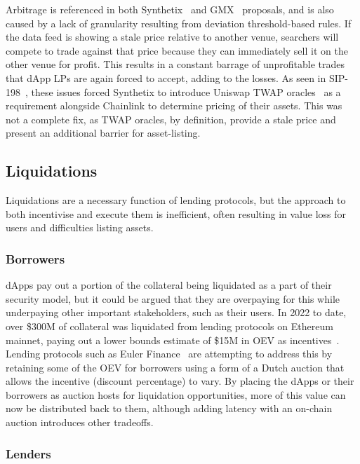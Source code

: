 \documentclass[11pt]{article}
\begin{document}
Arbitrage is referenced in both Synthetix~\cite{sip-198} and GMX~\cite{kip-17} proposals, and is also caused by a lack of granularity resulting from deviation threshold-based rules.
If the data feed is showing a stale price relative to another venue, searchers will compete to trade against that price because they can immediately sell it on the other venue for profit.
This results in a constant barrage of unprofitable trades that dApp LPs are again forced to accept, adding to the losses.
As seen in SIP-198~\cite{sip-198}, these issues forced Synthetix to introduce Uniswap TWAP oracles~\cite{uniswap} as a requirement alongside Chainlink to determine pricing of their assets.
This was not a complete fix, as TWAP oracles, by definition, provide a stale price and present an additional barrier for asset-listing.

\subsection{Liquidations}

Liquidations are a necessary function of lending protocols, but the approach to both incentivise and execute them is inefficient, often resulting in value loss for users and difficulties listing assets.

\subsubsection{Borrowers}

dApps pay out a portion of the collateral being liquidated as a part of their security model, but it could be argued that they are overpaying for this while underpaying other important stakeholders, such as their users.
In 2022 to date, over \$300M of collateral was liquidated from lending protocols on Ethereum mainnet, paying out a lower bounds estimate of \$15M in OEV as incentives~\cite{dune-liquidations}.
Lending protocols such as Euler Finance~\cite{euler} are attempting to address this by retaining some of the OEV for borrowers using a form of a Dutch auction that allows the incentive (discount percentage) to vary.
By placing the dApps or their borrowers as auction hosts for liquidation opportunities, more of this value can now be distributed back to them, although adding latency with an on-chain auction introduces other tradeoffs.

\subsubsection{Lenders}
\end{document}
